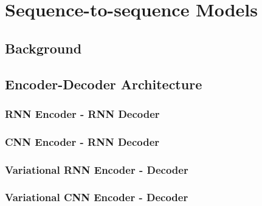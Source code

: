 \chapter{Sequence-to-sequence Models} \label{seq2seq}
\section{Background}
\section{Encoder-Decoder Architecture}
\subsection{RNN Encoder - RNN Decoder}
\subsection{CNN Encoder - RNN Decoder}
\subsection{Variational RNN Encoder - Decoder}
\subsection{Variational CNN Encoder - Decoder}